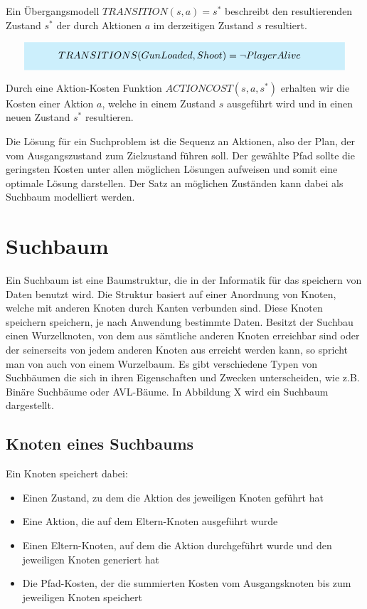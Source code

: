 Ein Übergangsmodell $TRANSITION(s,a) = s^*$ beschreibt den resultierenden Zustand $s^*$ der durch Aktionen $a$ im derzeitigen Zustand $s$ resultiert.

\[
\highlightbox{0.9\textwidth}{$
    \begin{aligned}
			TRANSITIONS(GunLoaded, Shoot) &= \lnot PlayerAlive
    \end{aligned}
$}
\]

Durch eine Aktion-Kosten Funktion $ACTIONCOST(s,a,s^*)$ erhalten wir die Kosten einer Aktion $a$, welche in einem Zustand $s$ ausgeführt wird und in einen neuen Zustand $s^*$ resultieren.

Die Lösung für ein Suchproblem ist die Sequenz an Aktionen, also der Plan, der vom Ausgangszustand zum Zielzustand führen soll. Der gewählte Pfad sollte die geringsten Kosten unter allen möglichen Lösungen aufweisen und somit eine optimale Lösung darstellen. Der Satz an möglichen Zuständen kann dabei als Suchbaum modelliert werden.


\section{Suchbaum}

Ein Suchbaum ist eine Baumstruktur, die in der Informatik für das speichern von Daten benutzt wird. Die Struktur basiert auf einer Anordnung von Knoten, welche mit anderen Knoten durch Kanten verbunden sind. Diese Knoten speichern speichern, je nach Anwendung bestimmte Daten. Besitzt der Suchbau einen Wurzelknoten, von dem aus sämtliche anderen Knoten erreichbar sind oder der seinerseits von jedem anderen Knoten aus erreicht werden kann, so spricht man von auch von einem Wurzelbaum. Es gibt verschiedene Typen von Suchbäumen die sich in ihren Eigenschaften und Zwecken unterscheiden, wie z.B. Binäre Suchbäume oder AVL-Bäume. In Abbildung X wird ein Suchbaum dargestellt.

\subsection{Knoten eines Suchbaums}
Ein Knoten speichert dabei:
\begin{itemize}
	\item Einen Zustand, zu dem die Aktion des jeweiligen Knoten geführt hat
	\item Eine Aktion, die auf dem Eltern-Knoten ausgeführt wurde
	\item Einen Eltern-Knoten, auf dem die Aktion durchgeführt wurde und den jeweiligen Knoten generiert hat
	\item Die Pfad-Kosten, der die summierten Kosten vom Ausgangsknoten bis zum jeweiligen Knoten speichert
\end{itemize}


